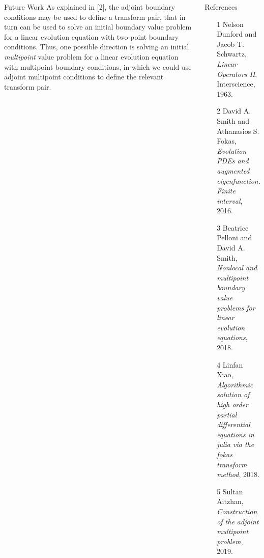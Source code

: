 \documentclass[serif, final, noamsthm]{beamer} %
\begin{document}
\begin{center}
\begin{frame}
\begin{columns}[t]
{

\begin{block}{Future Work}
\justifying
As explained in [2], the adjoint boundary conditions may be used to define a transform pair, that in turn can be used to solve an initial boundary value problem for a linear evolution equation with two-point boundary conditions. Thus, one possible direction is solving an initial \emph{multipoint} value problem for a linear evolution equation with multipoint boundary conditions, in which we could use adjoint multipoint conditions to define the relevant transform pair. 
\end{block}
\begin{block}{References}
\begin{itemize}
\item[1] Nelson Dunford and Jacob T. Schwartz, \textit{Linear Operators II}, Interscience, 1963.
\item[2] David A. Smith and Athanasios S. Fokas, \textit{Evolution PDEs and augmented eigenfunction. Finite interval}, 2016.
\item[3] Beatrice Pelloni and David A. Smith, \textit{Nonlocal and multipoint boundary value problems for linear evolution equations}, 2018.
\item[4] Linfan Xiao, \textit{Algorithmic solution of high order partial differential equations in julia via the fokas transform method}, 2018.
\item[5] Sultan Aitzhan, \textit{Construction of the adjoint multipoint problem}, 2019.
\end{itemize}
\end{block}
          
}
\end{columns}
\end{frame}
\end{center}
\end{document}
